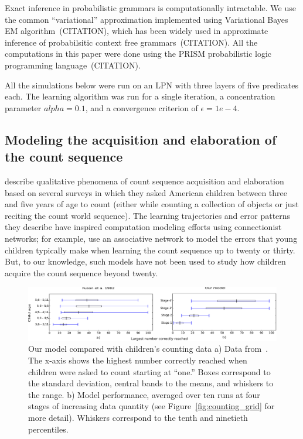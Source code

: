 \documentclass[10pt,letterpaper]{article}
\begin{document}
Exact inference in probabilistic grammars is computationally
intractable. We use the common ``variational'' approximation
implemented using Variational Bayes EM algorithm~(CITATION), which has
been widely used in approximate inference of probabilsitic context
free grammars~(CITATION). All the computations in this paper were done
using the PRISM probabilistic logic programming language~(CITATION).

All the simulations below were run on an LPN with three layers of five
predicates each. The learning algorithm was run for a single
iteration, a concentration parameter $alpha=0.1$, and a convergence
criterion of $\epsilon=1e-4$.

\subsection{Modeling the acquisition and elaboration of the count sequence}

\citet{FusRicBriar1982} describe qualitative phenomena of
count sequence acquisition and elaboration based on several surveys in
which they asked American children between three and five years of age
to count (either while counting a collection of objects or just
reciting the count world sequence). The learning trajectories and
error patterns they describe have inspired computation modeling
efforts using connectionist networks; for example,
\citet{ma1989modeling} use an associative network to model the errors
that young children typically make when learning the count sequence up
to twenty or thirty. But, to our knowledge, such models have not been
used to study how children acquire the count sequence beyond twenty.


\begin{figure}[t]
\includegraphics[width=0.9\linewidth]{figures/modelboxplot}
\caption{Our model compared with children's counting data a) Data
  from~\citet{FusRicBriar1982}. The x-axis shows the highest number
  correctly reached when children were asked to count starting at
  ``one.'' Boxes correspond to the standard deviation, central bands
  to the means, and whiskers to the range. b) Model performance,
  averaged over ten runs at four stages of increasing data quantity
  (see Figure~\ref{fig:counting_grid} for more detail). Whiskers
  correspond to the tenth and ninetieth percentiles.
\label{fig:fuson_model_comparison}}
\end{figure}
\end{document}
